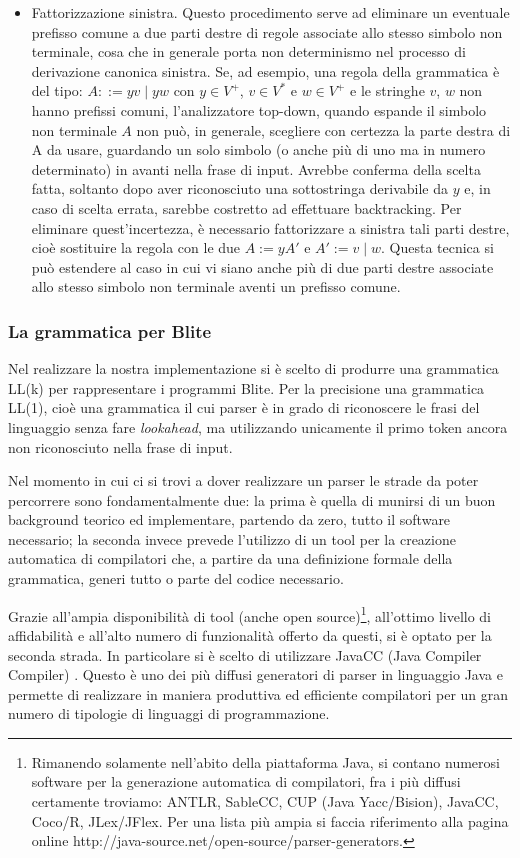\begin{itemize}
  \item Fattorizzazione sinistra. Questo procedimento serve ad eliminare un
  eventuale prefisso comune a due parti destre di regole associate allo stesso
  simbolo non terminale, cosa che in generale porta non determinismo nel
  processo di derivazione canonica sinistra. Se, ad esempio, una regola della grammatica
  è del tipo: $A ::= yv \;|\; yw$ con $y \in V^+$, $v
  \in V^*$ e $w \in V^+$ e le stringhe $v$, $w$ non hanno prefissi comuni,
  l'analizzatore top-down, quando espande il simbolo non terminale $A$ non può,
  in generale, scegliere con certezza la parte destra di A da usare,
  guardando un solo simbolo (o anche più di uno ma in numero determinato) in
  avanti nella frase di input. Avrebbe conferma della scelta fatta, soltanto
  dopo aver riconosciuto una sottostringa derivabile da $y$ e, in caso di scelta
  errata, sarebbe costretto ad effettuare backtracking. Per eliminare
  quest'incertezza, è necessario fattorizzare a sinistra tali parti destre,
  cioè sostituire la regola con le due $A := yA'$ e $A' := v \; | \; w$.
  Questa tecnica si può estendere al caso in cui vi siano anche più di due
  parti destre associate allo stesso simbolo non terminale aventi un prefisso
  comune.
\end{itemize}

\subsubsection{La grammatica per Blite}

Nel realizzare la nostra implementazione si è scelto di produrre una grammatica
LL(k) per rappresentare i programmi Blite. Per la precisione una grammatica
LL(1), cioè una grammatica il cui parser è in grado di riconoscere le frasi del
linguaggio senza fare \emph{lookahead}, ma utilizzando unicamente il primo token
ancora non riconosciuto nella frase di input.

Nel momento in cui ci si trovi a dover realizzare un parser le strade da poter
percorrere sono fondamentalmente due: la prima è quella di munirsi di un buon
background teorico ed implementare, partendo da zero, tutto il software
necessario; la seconda invece prevede l'utilizzo di un tool per la creazione
automatica di compilatori che, a partire da una definizione formale della
grammatica, generi tutto o parte del codice necessario.

Grazie all'ampia disponibilità di tool (anche open source)\footnote{Rimanendo
solamente nell'abito della piattaforma Java, si contano numerosi software per
la generazione automatica di compilatori, fra i più diffusi certamente troviamo:
ANTLR, SableCC, CUP (Java Yacc/Bision), JavaCC, Coco/R, JLex/JFlex. Per una
lista più ampia si faccia riferimento alla pagina online
http://java-source.net/open-source/parser-generators.}, all'ottimo livello di
affidabilità e all'alto numero di funzionalità offerto da questi, si è optato
per la seconda strada. In particolare si è scelto di utilizzare JavaCC (Java
Compiler Compiler) \cite{JavaCC}. Questo è uno dei più diffusi generatori
di parser in linguaggio Java e permette di realizzare in maniera produttiva ed
efficiente compilatori per un gran numero di tipologie di linguaggi di
programmazione.

